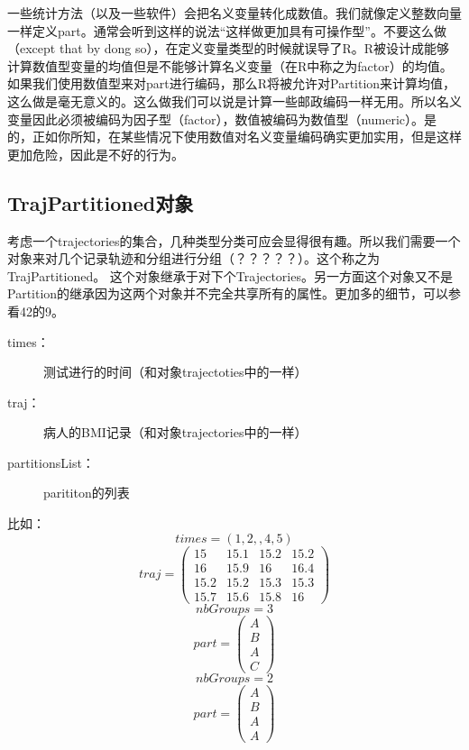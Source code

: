 \documentclass[12pt,a4paper]{article}\usepackage{graphicx, color}
\begin{document}
\scalebox{4}{\HandRight}一些统计方法（以及一些软件）会把名义变量转化成数值。我们就像定义整数向量一样定义part。通常会听到这样的说法“这样做更加具有可操作型”。不要这么做（except that by dong so），在定义变量类型的时候就误导了R。R被设计成能够计算数值型变量的均值但是不能够计算名义变量（在R中称之为factor）的均值。如果我们使用数值型来对part进行编码，那么R将被允许对Partition来计算均值，这么做是毫无意义的。这么做我们可以说是计算一些邮政编码一样无用。所以名义变量因此必须被编码为因子型（factor），数值被编码为数值型（numeric）。是的，正如你所知，在某些情况下使用数值对名义变量编码确实更加实用，但是这样更加危险，因此是不好的行为。

\subsection{TrajPartitioned对象}
考虑一个trajectories的集合，几种类型分类可应会显得很有趣。所以我们需要一个对象来对几个记录轨迹和分组进行分组（？？？？？）。这个称之为TrajPartitioned。
这个对象继承于对下个Trajectories。另一方面这个对象又不是Partition的继承因为这两个对象并不完全共享所有的属性。更加多的细节，可以参看42的9。
\begin{description}
  \item[times：]测试进行的时间（和对象trajectoties中的一样）
  \item[traj：]病人的BMI记录（和对象trajectories中的一样）
  \item[partitionsList：]parititon的列表
\end{description}
比如：
\[times=(1,2,,4,5)\]
\[traj=\begin{pmatrix}15 & 15.1 & 15.2 & 15.2\\
16 & 15.9 & 16 & 16.4\\
15.2 & 15.2 & 15.3 & 15.3\\
15.7 & 15.6 & 15.8 & 16
\end{pmatrix}\]
\[nbGroups=3\]
\[part=\begin{pmatrix}A\\
B\\
A\\
C
\end{pmatrix}
\]
\[nbGroups=2\]
\[part=\begin{pmatrix}A\\
B\\
A\\
A
\end{pmatrix}
\]
\end{document}
